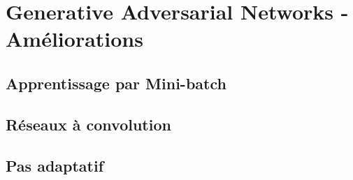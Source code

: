 \chapter{Generative Adversarial Networks - Améliorations}


\section{Apprentissage par Mini-batch}

\section{Réseaux à convolution}

\section{Pas adaptatif}


